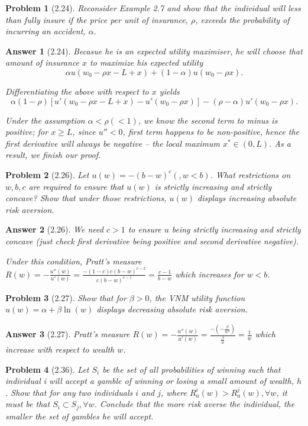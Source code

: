 \documentclass{article}
\newtheorem*{ans}{Answer}
\newtheorem*{prob}{{\bf Problem}}
\newcommand{\1}{{\bf 1}}
\newcommand{\0}{{\mathbf{0}}}
\newcommand{\<}{\langle}
\renewcommand{\>}{\rangle}
\begin{document}
\begin{prob}[2.24]
	Reconsider Example 2.7 and show that the individual will less than fully insure if the price per unit of insurance, $ \rho $, exceeds the probability of incurring an accident, $ \alpha $.
\end{prob}
\begin{ans}[2.24] Becasue he is an expected utility maximiser, he will choose that amount of insurance $x$ to maximize his expected utility
	$$\alpha u(w_0 - \rho x - L + x) + (1-\alpha) u(w_0 - \rho x).
	$$
	
	Differentiating the above with respect to $x$ yields
	$$
	\alpha (1- \rho )\left[ u'(w_0 -  \rho x - L + x) - u' (w_0 - \rho x)\right] - ( \rho - \alpha  ) u' (w_0 - \rho x).
	$$
	
	Under the assumption $ \alpha < \rho (<1)$, we know the second term to minus is positive; for $x\ge L$, since $u''<0$, first term happens to be non-positive, hence the first derivative will always be negative -- the local maximum $x^* \in (0,L)$. As a result, we finish our proof. 

\end{ans}
\begin{prob}[2.26] Let $u(w) = - (b - w)^c(, w <  	b)$. What restrictions on $w, b, c$ are required to ensure that $u(w)$ is strictly increasing and strictly concave? Show that under those restrictions, $u(w)$ displays increasing absolute risk aversion.
\end{prob}
\begin{ans}[2.26] We need $c> 1$ to ensure $u$ being strictly increasing and strictly concave (just check first derivative being positive and second derivative negative).
	
	Under this condition, Pratt's measure $R(w) = -\frac{u''(w)}{u'(w)} = \frac{-(1-c)c(b-w)^{c-2}}{c(b-w)^{c-1}} = \frac{c-1}{b-w} $ which increases for $w <b$.
\end{ans}
\begin{prob}[2.27]
	Show that for $ \beta > 0$, the VNM utility function $u(w) = \alpha + \beta \ln(w)$ displays decreasing absolute risk aversion.
\end{prob}
\begin{ans}[2.27] Pratt's measure 
	$R(w) = -\frac{u''(w)}{u'(w)} = \frac{- \left( - \frac{\beta}{w^2} \right)}{\frac{\beta}{w}} = \frac1w$ which increase with respect to wealth $w$.
\end{ans}

\begin{prob}[2.36] Let $S_i$ be the set of all probabilities of winning such that individual i will accept a gamble of winning or losing a small amount of wealth, $h$. Show that for any two individuals $i$ and $j$, where $R^i_a(w) > R^j_a(w), \forall w$, it must be that $S_i \subset S_j,\forall w$. Conclude that the more risk averse the individual, the smaller the set of gambles he will accept.
\end{prob}
\end{document}
